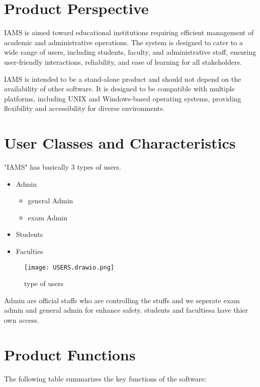\documentclass{scrreprt}
\begin{document}
\section{Product Perspective}
IAMS is aimed toward educational institutions requiring efficient management of academic and administrative operations. The system is designed to cater to a wide range of users, including students, faculty, and administrative staff, ensuring user-friendly interactions, reliability, and ease of learning for all stakeholders.

IAMS is intended to be a stand-alone product and should not depend on the availability of other software. It is designed to be compatible with multiple platforms, including UNIX and Windows-based operating systems, providing flexibility and accessibility for diverse environments.

 

\section{User Classes and Characteristics}
"IAMS" has basically 3 types of users. 
\begin{itemize}
  \item Admin
    \begin{itemize}
        \item general Admin
        \item exam Admin
    \end{itemize}
  \item Students
  \item Faculties
\end{itemize}

\begin{figure}
    \centering
    \texttt{[image: USERS.drawio.png]}
    \caption{type of users}
    \label{fig:type of users}
\end{figure}
 Admin are official staffs who are controlling the stuffs and we seperate exam admin and general admin for enhance safety. students and facultiesa have thier own access.

\section{Product Functions}

The following table summarizes the key functions of the software:
\end{document}
